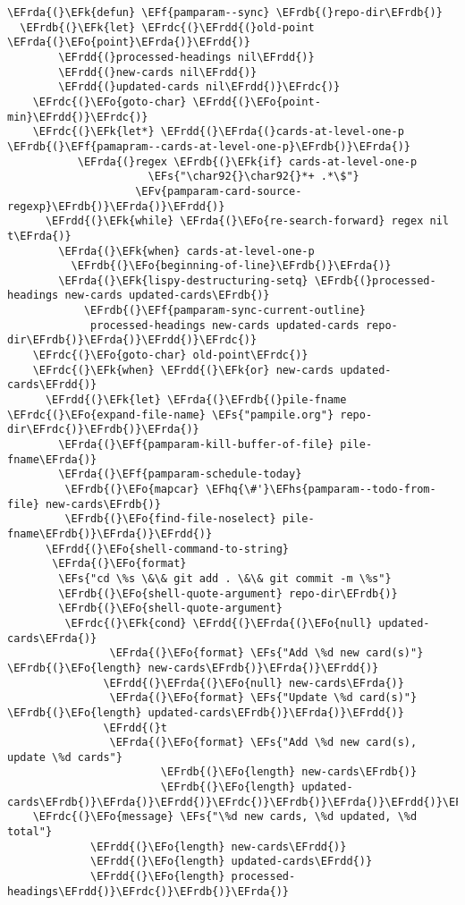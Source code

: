\documentclass[a4wide,10pt]{article}
\newcommand{\EFs}[1]{\textcolor{EFs}{#1}} %
\newcommand{\EFk}[1]{\textcolor{EFk}{#1}} %
\newcommand{\EFf}[1]{\textcolor{EFf}{#1}} %
\newcommand{\EFv}[1]{\textcolor{EFv}{#1}} %
\newcommand{\EFo}[1]{\textcolor{EFo}{#1}} %
\newcommand{\EFhq}[1]{\textcolor{EFhq}{#1}} %
\newcommand{\EFhs}[1]{\textcolor{EFhs}{#1}} %
\newcommand{\EFrda}[1]{\textcolor{EFrda}{#1}} %
\newcommand{\EFrdb}[1]{\textcolor{EFrdb}{#1}} %
\newcommand{\EFrdc}[1]{\textcolor{EFrdc}{#1}} %
\newcommand{\EFrdd}[1]{\textcolor{EFrdd}{#1}} %
\begin{document}
\begin{Code}
\begin{Verbatim}
\EFrda{(}\EFk{defun} \EFf{pamparam--sync} \EFrdb{(}repo-dir\EFrdb{)}
  \EFrdb{(}\EFk{let} \EFrdc{(}\EFrdd{(}old-point \EFrda{(}\EFo{point}\EFrda{)}\EFrdd{)}
        \EFrdd{(}processed-headings nil\EFrdd{)}
        \EFrdd{(}new-cards nil\EFrdd{)}
        \EFrdd{(}updated-cards nil\EFrdd{)}\EFrdc{)}
    \EFrdc{(}\EFo{goto-char} \EFrdd{(}\EFo{point-min}\EFrdd{)}\EFrdc{)}
    \EFrdc{(}\EFk{let*} \EFrdd{(}\EFrda{(}cards-at-level-one-p \EFrdb{(}\EFf{pamapram--cards-at-level-one-p}\EFrdb{)}\EFrda{)}
           \EFrda{(}regex \EFrdb{(}\EFk{if} cards-at-level-one-p
                      \EFs{"\char92{}\char92{}*+ .*\$"}
                    \EFv{pamparam-card-source-regexp}\EFrdb{)}\EFrda{)}\EFrdd{)}
      \EFrdd{(}\EFk{while} \EFrda{(}\EFo{re-search-forward} regex nil t\EFrda{)}
        \EFrda{(}\EFk{when} cards-at-level-one-p
          \EFrdb{(}\EFo{beginning-of-line}\EFrdb{)}\EFrda{)}
        \EFrda{(}\EFk{lispy-destructuring-setq} \EFrdb{(}processed-headings new-cards updated-cards\EFrdb{)}
            \EFrdb{(}\EFf{pamparam-sync-current-outline}
             processed-headings new-cards updated-cards repo-dir\EFrdb{)}\EFrda{)}\EFrdd{)}\EFrdc{)}
    \EFrdc{(}\EFo{goto-char} old-point\EFrdc{)}
    \EFrdc{(}\EFk{when} \EFrdd{(}\EFk{or} new-cards updated-cards\EFrdd{)}
      \EFrdd{(}\EFk{let} \EFrda{(}\EFrdb{(}pile-fname \EFrdc{(}\EFo{expand-file-name} \EFs{"pampile.org"} repo-dir\EFrdc{)}\EFrdb{)}\EFrda{)}
        \EFrda{(}\EFf{pamparam-kill-buffer-of-file} pile-fname\EFrda{)}
        \EFrda{(}\EFf{pamparam-schedule-today}
         \EFrdb{(}\EFo{mapcar} \EFhq{\#'}\EFhs{pamparam--todo-from-file} new-cards\EFrdb{)}
         \EFrdb{(}\EFo{find-file-noselect} pile-fname\EFrdb{)}\EFrda{)}\EFrdd{)}
      \EFrdd{(}\EFo{shell-command-to-string}
       \EFrda{(}\EFo{format}
        \EFs{"cd \%s \&\& git add . \&\& git commit -m \%s"}
        \EFrdb{(}\EFo{shell-quote-argument} repo-dir\EFrdb{)}
        \EFrdb{(}\EFo{shell-quote-argument}
         \EFrdc{(}\EFk{cond} \EFrdd{(}\EFrda{(}\EFo{null} updated-cards\EFrda{)}
                \EFrda{(}\EFo{format} \EFs{"Add \%d new card(s)"} \EFrdb{(}\EFo{length} new-cards\EFrdb{)}\EFrda{)}\EFrdd{)}
               \EFrdd{(}\EFrda{(}\EFo{null} new-cards\EFrda{)}
                \EFrda{(}\EFo{format} \EFs{"Update \%d card(s)"} \EFrdb{(}\EFo{length} updated-cards\EFrdb{)}\EFrda{)}\EFrdd{)}
               \EFrdd{(}t
                \EFrda{(}\EFo{format} \EFs{"Add \%d new card(s), update \%d cards"}
                        \EFrdb{(}\EFo{length} new-cards\EFrdb{)}
                        \EFrdb{(}\EFo{length} updated-cards\EFrdb{)}\EFrda{)}\EFrdd{)}\EFrdc{)}\EFrdb{)}\EFrda{)}\EFrdd{)}\EFrdc{)}
    \EFrdc{(}\EFo{message} \EFs{"\%d new cards, \%d updated, \%d total"}
             \EFrdd{(}\EFo{length} new-cards\EFrdd{)}
             \EFrdd{(}\EFo{length} updated-cards\EFrdd{)}
             \EFrdd{(}\EFo{length} processed-headings\EFrdd{)}\EFrdc{)}\EFrdb{)}\EFrda{)}



\end{Verbatim}
\end{Code}
\end{document}
